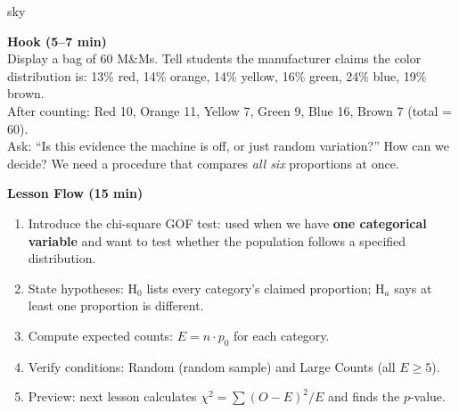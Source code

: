 \documentclass[10pt]{article}
\begin{document}
\begin{skillbox}{sky}
\begin{minipage}[t]{0.48\linewidth}
    \textbf{Hook (5--7 min)}\\
    Display a bag of 60 M\&Ms. Tell students the manufacturer claims the color
    distribution is: 13\% red, 14\% orange, 14\% yellow, 16\% green, 24\% blue,
    19\% brown.\\[4pt]
    After counting: Red 10, Orange 11, Yellow 7, Green 9, Blue 16, Brown 7 (total = 60).\\[4pt]
    Ask: ``Is this evidence the machine is off, or just random variation?'' How can we
    decide? We need a procedure that compares \emph{all six} proportions at once.
\end{minipage}
\hfill
\begin{minipage}[t]{0.48\linewidth}
    \textbf{Lesson Flow (15 min)}
    \begin{enumerate}
        \item Introduce the chi-square GOF test: used when we have \textbf{one categorical
              variable} and want to test whether the population follows a specified
              distribution.
        \item State hypotheses: H$_0$ lists every category's claimed proportion; H$_a$
              says at least one proportion is different.
        \item Compute expected counts: $E = n \cdot p_0$ for each category.
        \item Verify conditions: Random (random sample) and Large Counts (all $E \ge 5$).
        \item Preview: next lesson calculates $\chi^2 = \sum (O-E)^2/E$ and finds
              the $p$-value.
    \end{enumerate}
\end{minipage}
\end{skillbox}
\end{document}
